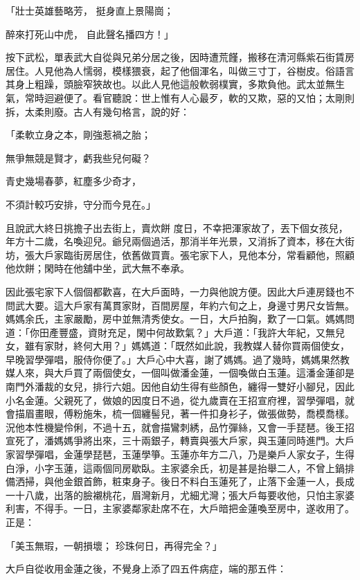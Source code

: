 「壯士英雄藝略芳，  挺身直上景陽崗；

醉來打死山中虎，  自此聲名播四方！」

按下武松，單表武大自從與兄弟分居之後，因時遭荒饉，搬移在清河縣紫石街賃房居住。人見他為人懦弱，模樣猥衰，起了他個渾名，叫做三寸丁，谷樹皮。俗語言其身上粗躁，頭臉窄狹故也。以此人見他這般軟弱樸實，多欺負他。武太並無生氣，常時迴避便了。看官聽說：世上惟有人心最歹，軟的又欺，惡的又怕；太剛則拆，太柔則廢。古人有幾句格言，說的好：

「柔軟立身之本，剛強惹禍之胎；

無爭無競是賢才，虧我些兒何礙？

青史幾場春夢，紅塵多少奇才，

不須計較巧安排，守分而今見在。」

且說武大終日挑擔子出去街上，賣炊餅 度日，不幸把渾家故了，丟下個女孩兒，年方十二歲，名喚迎兒。爺兒兩個過活，那消半年光景，又消拆了資本，移在大街坊，張大戶家臨街房居住，依舊做買賣。張宅家下人，見他本分，常看顧他，照顧他炊餅；閑時在他舖中坐，武大無不奉承。

因此張宅家下人個個都歡喜，在大戶面時，一力與他說方便。因此大戶連房錢也不問武大要。這大戶家有萬貫家財，百間房屋，年約六旬之上，身邊寸男尺女皆無。媽媽余氏，主家嚴勵，房中並無清秀使女。一日，大戶拍胸，歎了一口氣。媽媽問道：「你田產豐盛，資財充足，閑中何故歎氣？」大戶道：「我許大年紀，又無兒女，雖有家財，終何大用？」媽媽道：「既然如此說，我教媒人替你買兩個使女，早晚習學彈唱，服侍你便了。」大戶心中大喜，謝了媽媽。過了幾時，媽媽果然教媒人來，與大戶買了兩個使女，一個叫做潘金蓮，一個喚做白玉蓮。這潘金蓮卻是南門外潘裁的女兒，排行六姐。因他自幼生得有些顏色，纏得一雙好小腳兒，因此小名金蓮。父親死了，做娘的因度日不過，從九歲賣在王招宣府裡，習學彈唱，就會描眉畫眼，傅粉施朱，梳一個纏髻兒，著一件扣身衫子，做張做勢，喬模喬樣。況他本性機變伶俐，不過十五，就會描鸞刺綉，品竹彈絲，又會一手琵琶。後王招宣死了，潘媽媽爭將出來，三十兩銀子，轉賣與張大戶家，與玉蓮同時進門。大戶家習學彈唱，金蓮學琵琶，玉蓮學箏。玉蓮亦年方二八，乃是樂戶人家女子，生得白淨，小字玉蓮，這兩個同房歇臥。主家婆余氏，初是甚是抬舉二人，不曾上鍋排備洒掃，與他金銀首飾，粧束身子。後日不料白玉蓮死了，止落下金蓮一人，長成一十八歲，出落的臉襯桃花，眉灣新月，尤細尤灣；張大戶每要收他，只怕主家婆利害，不得手。一日，主家婆鄰家赴席不在，大戶暗把金蓮喚至房中，遂收用了。正是：

「美玉無瑕，一朝損壞；  珍珠何日，再得完全？」

大戶自從收用金蓮之後，不覺身上添了四五件病症，端的那五件：

